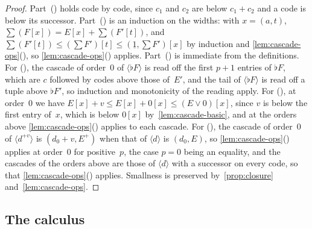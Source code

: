 \documentclass[11pt]{amsart}
\newcommand{\bplus}{\mathbin{+}}
\newcommand{\num}[1]{\underline{#1}}          %
\newcommand{\tsum}[1]{\textstyle\sum #1}
\newcommand{\act}[2]{#1[#2]}                  %
\newcommand{\rd}[1]{\langle #1 \rangle}       %
\theoremstyle{plain}
\theoremstyle{definition}
\begin{document}
\begin{proof}
Part~() holds code by code, since $c_1$ and
$c_2$ are below $c_1 \bplus c_2$ and a code is below its successor.
Part~() is an induction on the widths: with
$x = (a,t)$,
$\tsum(\act F x) = \act E x \bplus \tsum(\act{F'}{t})$, and
$\tsum(\act{F'}{t}) \le \act{(\tsum F')}{t} \le
\act{(\num 1, \tsum F')}{x}$ by induction and
\cref{lem:cascade-ops}(), so
\cref{lem:cascade-ops}() applies.
Part~() is immediate from the definitions. For
(), the cascade of order~$0$ of $\rd{\flat F}$
is read off the first $p+1$ entries of $\flat F$, which are $c$
followed by codes above those of~$E'$, and the tail of $\rd{\flat F}$
is read off a tuple above $\flat F'$, so induction and monotonicity of
the reading apply. For (), at order~$0$ we have
$\act E x \bplus v \le \act E x \bplus \act 0 x \le
\act{(E \vee 0)}{x}$, since $v$ is below the first entry of~$x$,
which is below $\act 0 x$ by~\cref{lem:cascade-basic}, and at the
orders above \cref{lem:cascade-ops}() applies to
each cascade. For (), the cascade of order~$0$
of $\rd{d^{+v}}$ is $(d_0 \bplus v, E^{+})$ when that of $\rd d$ is
$(d_0, E)$, so \cref{lem:cascade-ops}() applies
at order~$0$ for positive~$p$, the case $p = 0$ being an equality, and
the cascades of the orders above are those of $\rd d$ with a successor
on every code, so that \cref{lem:cascade-ops}()
applies. Smallness is preserved by~\cref{prop:closure}
and~\cref{lem:cascade-ops}.
\end{proof}

\subsection{The calculus}
\label{sec:calculus}
\end{document}
